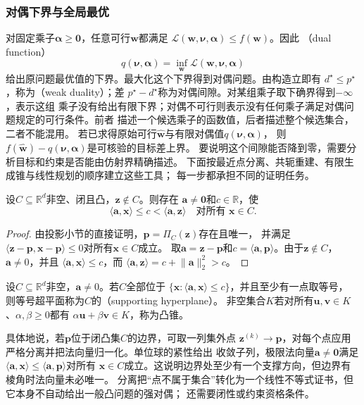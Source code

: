 \subsubsection{对偶下界与全局最优}
\label{sec:opt-duality}
\label{sec:opt-affine-certificates}

对固定乘子$\bm{\alpha}\geq\bm{0}$，任意可行$\bm{w}$都满足
$\mathcal{L}(\bm{w},\bm{\nu},\bm{\alpha})\leq f(\bm{w})$。因此
（dual function）
\[
  q(\bm{\nu},\bm{\alpha})
  =\inf_{\bm{w}}\mathcal{L}(\bm{w},\bm{\nu},\bm{\alpha})
\]
给出原问题最优值的下界。最大化这个下界得到对偶问题。由构造立即有
$d^{\star}\leq p^{\star}$，称为（weak duality）；差
$p^{\star}-d^{\star}$称为对偶间隙。对某组乘子取下确界得到$-\infty$，表示这组
乘子没有给出有限下界；对偶不可行则表示没有任何乘子满足对偶问题规定的可行条件。前者
描述一个候选乘子的函数值，后者描述整个候选集合，二者不能混用。
若已求得原始可行$\widehat{\bm w}$与有限对偶值$q(\bm\nu,\bm\alpha)$，
则$f(\widehat{\bm w})-q(\bm\nu,\bm\alpha)$是可核验的目标差上界。
要说明这个间隙能否降到零，需要分析目标和约束是否能由仿射界精确描述。
下面按最近点分离、共轭重建、有限生成锥与线性规划的顺序建立这些工具；
每一步都承担不同的证明任务。

\begin{theorem}[闭凸集外一点的严格分离]
\label{thm:opt-projection-separation}
设$C\subseteq\mathbb{R}^d$非空、闭且凸，$\bm{z}\notin C$。则存在
$\bm{a}\neq\bm{0}$和$c\in\mathbb{R}$，使
\[
  \langle\bm{a},\bm{x}\rangle\leq c
  <\langle\bm{a},\bm{z}\rangle
  \quad\text{对所有 }\bm{x}\in C.
\]
\end{theorem}

\begin{proof}
由投影小节的直接证明，$\bm p=\Pi_C(\bm z)$存在且唯一，
并满足$\langle\bm z-\bm p,\bm x-\bm p\rangle\leq0$对所有$\bm x\in C$成立。
取$\bm a=\bm z-\bm p$和$c=\langle\bm a,\bm p\rangle$。由于$\bm z\notin C$，
$\bm a\neq0$，并且
$\langle\bm{a},\bm{x}\rangle\leq c$，而
$\langle\bm{a},\bm{z}\rangle=c+\lVert\bm{a}\rVert_2^2>c$。
\end{proof}

\begin{definition}[支撑超平面与凸锥]
\label{def:opt-supporting-hyperplane-cone}
设$C\subseteq\mathbb R^d$非空，$\bm a\neq0$。若$C$全部位于
$\{\bm x:\langle\bm a,\bm x\rangle\leq c\}$，并且至少有一点取等号，
则等号超平面称为$C$的（supporting hyperplane）。
非空集合$K$若对所有$\bm u,\bm v\in K$、$\alpha,\beta\geq0$都有
$\alpha\bm u+\beta\bm v\in K$，称为凸锥。
\end{definition}
具体地说，若$\bm{p}$位于闭凸集$C$的边界，可取一列集外点
$\bm{z}^{(k)}\to\bm{p}$，对每个点应用严格分离并把法向量归一化。单位球的紧性给出
收敛子列，极限法向量$\bm{a}\neq\bm{0}$满足
$\langle\bm{a},\bm{x}\rangle\leq\langle\bm{a},\bm{p}\rangle$对所有
$\bm{x}\in C$成立。这说明边界处至少有一个支撑方向，但边界有棱角时法向量未必唯一。
分离把“点不属于集合”转化为一个线性不等式证书，但它本身不自动给出一般凸问题的强对偶；
还需要闭性或约束资格条件。

